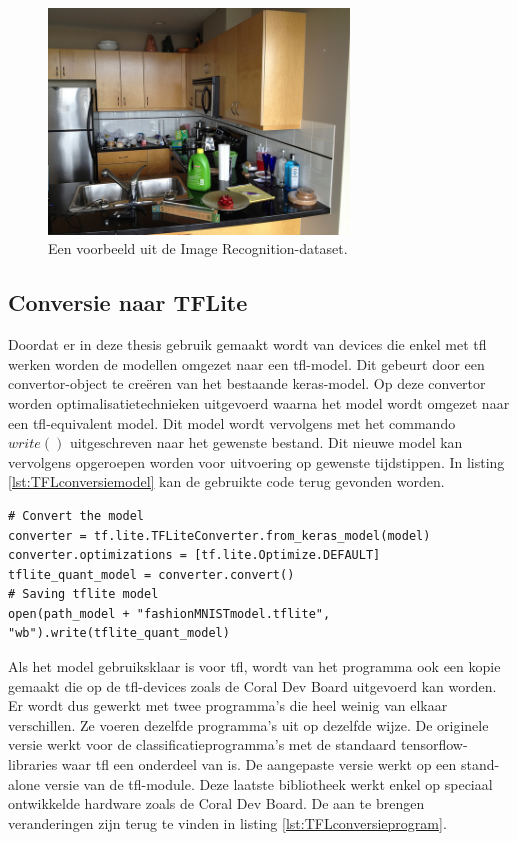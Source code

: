 		\begin{figure}
			\centering
			\includegraphics[width=80mm]{afbeeldingen/ImRec1.jpg}
			\caption{Een voorbeeld uit de Image Recognition-dataset.}
			\label{fig:ImRec1}
		\end{figure}

	\subsection{Conversie naar TFLite} \label{prg:ConversieTFL}
		Doordat er in deze thesis gebruik gemaakt wordt van devices die enkel met \gls{tfl} werken worden de modellen omgezet naar een \gls{tfl}-model. Dit gebeurt door een convertor-object te cre\"eren van het bestaande keras-model. Op deze convertor worden optimalisatietechnieken uitgevoerd waarna het model wordt omgezet naar een \gls{tfl}-equivalent model. Dit model wordt vervolgens met het commando $write()$ uitgeschreven naar het gewenste bestand. Dit nieuwe model kan vervolgens opgeroepen worden voor uitvoering op gewenste tijdstippen. In listing \ref{lst:TFLconversiemodel} kan de gebruikte code terug gevonden worden.
	
	\begin{lstlisting}[caption={Converteren naar een TFLite-model.}, captionpos=b,label={lst:TFLconversiemodel}]
# Convert the model
converter = tf.lite.TFLiteConverter.from_keras_model(model)
converter.optimizations = [tf.lite.Optimize.DEFAULT]
tflite_quant_model = converter.convert()
# Saving tflite model
open(path_model + "fashionMNISTmodel.tflite", "wb").write(tflite_quant_model)
\end{lstlisting}	
	
		Als het model gebruiksklaar is voor \gls{tfl}, wordt van het programma ook een kopie gemaakt die op de \gls{tfl}-devices zoals de Coral Dev Board uitgevoerd kan worden. Er wordt dus gewerkt met twee programma's die heel weinig van elkaar verschillen. Ze voeren dezelfde programma's uit op dezelfde wijze. De originele versie werkt voor de classificatieprogramma's met de standaard tensorflow-libraries waar \gls{tfl} een onderdeel van is. De aangepaste versie werkt op een stand-alone versie van de \gls{tfl}-module. Deze laatste bibliotheek werkt enkel op speciaal ontwikkelde hardware zoals de Coral Dev Board. De aan te brengen veranderingen zijn terug te vinden in listing \ref{lst:TFLconversieprogram}. \\
		
